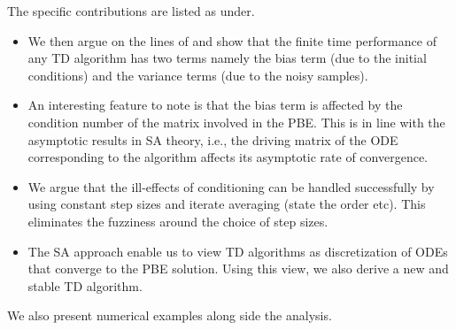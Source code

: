 The specific contributions are listed as under.
\begin{itemize} 
\item We then argue on the lines of \cite{} and show that the finite time performance of any TD algorithm has two terms namely the bias term (due to the initial conditions) and the variance terms (due to the noisy samples). 
\item An interesting feature to note is that the bias term is affected by the condition number of the matrix involved in the PBE. This is in line with the asymptotic results in SA theory, i.e., the driving matrix of the ODE corresponding to the algorithm affects its asymptotic rate of convergence. 
\item We argue that the ill-effects of conditioning can be handled successfully by using constant step sizes and iterate averaging (state the order etc). This eliminates the fuzziness around the choice of step sizes.
\item The SA approach enable us to view TD algorithms as discretization of ODEs that converge to the PBE solution. Using this view, we also derive a new and stable TD algorithm.
\end{itemize}
We also present numerical examples along side the analysis.
